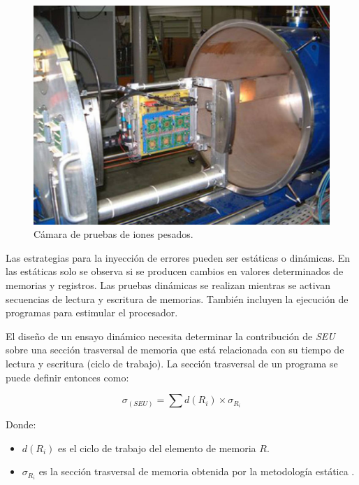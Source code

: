 \begin{figure}[htbp]
	\centering
	\includegraphics[width=\textwidth]{./Figures/heavy_ion_latchup_tests_in_louvain_la_neuve.jpg}
    \caption{Cámara de pruebas de iones pesados\protect\footnotemark.}
	\label{fig:iones}
\end{figure}


Las estrategias para la inyección de errores pueden ser estáticas o dinámicas.
En las estáticas solo se observa si se producen cambios en valores determinados de memorias y registros.
Las pruebas dinámicas se realizan mientras se activan secuencias de lectura y escritura de memorias.
También incluyen la ejecución de programas para estimular el procesador.

El diseño de un ensayo dinámico necesita determinar la contribución de \emph{SEU} sobre una sección trasversal de memoria que está relacionada con su tiempo de lectura y escritura (ciclo de trabajo).
La sección trasversal de un programa se puede definir entonces como:

\begin{equation}
	\label{eq:crosssection}
    \sigma_{(SEU)} = \sum{d(R_i) \times \sigma_{R_i}}
\end{equation}

\newpage

Donde:
\begin{itemize}
    \item $ d(R_i) $ es el ciclo de trabajo del elemento de memoria $ R $.
    \item $ \sigma_{R_i} $ es la sección trasversal de memoria obtenida por la metodología estática \citep{ARTICLE:velazco}.
\end{itemize}

